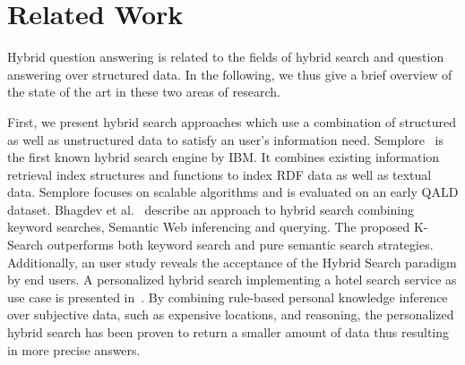 \section{Related Work} 
\label{sec:relatedwork}
Hybrid question answering is related to the fields of hybrid search and question answering over structured data. In the following, we thus give a brief overview of the state of the art in these two areas of research.

First, we present hybrid search approaches which use a combination of structured as well as unstructured data to satisfy an user's information need. 
Semplore~\cite{Zhang:2007a} is the first known hybrid search engine by IBM.
It combines existing information retrieval index structures and functions to index RDF data as well as textual data. 
Semplore focuses on scalable algorithms and is evaluated on an early QALD dataset.
Bhagdev et al.~\cite{Bhagdev:2008:HSE} describe an approach to hybrid search combining keyword searches, Semantic Web inferencing and querying. 
The proposed K-Search outperforms both keyword search and pure semantic search strategies.
Additionally, an user study reveals the acceptance of the Hybrid Search paradigm by end users.
A personalized hybrid search implementing a  hotel search service as use case is presented in~\cite{DBLP:journals/kbs/Yoo12}. 
By combining rule-based personal knowledge inference over subjective data, such as expensive locations, and reasoning, the personalized hybrid search has been proven to return a smaller amount of data thus resulting in more precise answers. 
